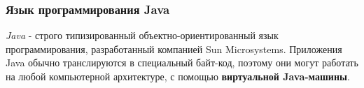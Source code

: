 \begin{frame}
\frametitle{Язык программирования Java} %
	\textit{Java} - строго типизированный объектно-ориентированный язык программирования, разработанный 
	компанией Sun Microsystems. Приложения Java обычно транслируются в специальный байт-код, поэтому 
	они могут работать на любой компьютерной архитектуре, с помощью \textbf{виртуальной Java-машины}.
\end{frame}

